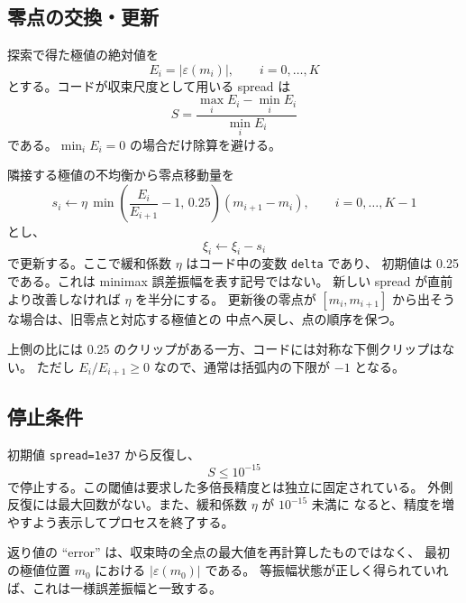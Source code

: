 \documentclass[a4paper,11pt]{ltjsarticle}
\newcommand{\code}[1]{\texttt{#1}}
\newcommand{\RelErr}{\varepsilon}
\begin{document}
\subsection{零点の交換・更新}

探索で得た極値の絶対値を
\begin{equation}
  E_i=|\RelErr(m_i)|,\qquad i=0,\ldots,K
\end{equation}
とする。コードが収束尺度として用いる spread は
\begin{equation}
  S=\frac{\max_i E_i-\min_i E_i}{\min_i E_i}
  \label{eq:spread}
\end{equation}
である。\(\min_i E_i=0\) の場合だけ除算を避ける。

隣接する極値の不均衡から零点移動量を
\begin{equation}
 s_i \leftarrow \eta\,
 \min\!\left(\frac{E_i}{E_{i+1}}-1,\,0.25\right)
 (m_{i+1}-m_i),
 \qquad i=0,\ldots,K-1
 \label{eq:step-update}
\end{equation}
とし、
\begin{equation}
  \xi_i\leftarrow\xi_i-s_i
  \label{eq:zero-update}
\end{equation}
で更新する。ここで緩和係数 \(\eta\) はコード中の変数 \code{delta} であり、
初期値は 0.25 である。これは minimax 誤差振幅を表す記号ではない。
新しい spread が直前より改善しなければ \(\eta\) を半分にする。
更新後の零点が \([m_i,m_{i+1}]\) から出そうな場合は、旧零点と対応する極値との
中点へ戻し、点の順序を保つ。

上側の比には 0.25 のクリップがある一方、コードには対称な下側クリップはない。
ただし \(E_i/E_{i+1}\geq0\) なので、通常は括弧内の下限が \(-1\) となる。

\subsection{停止条件}

初期値 \code{spread=1e37} から反復し、
\begin{equation}
  S\leq 10^{-15}
  \label{eq:stop}
\end{equation}
で停止する。この閾値は要求した多倍長精度とは独立に固定されている。
外側反復には最大回数がない。また、緩和係数 \(\eta\) が \(10^{-15}\) 未満に
なると、精度を増やすよう表示してプロセスを終了する。

返り値の ``error'' は、収束時の全点の最大値を再計算したものではなく、
最初の極値位置 \(m_0\) における \(|\RelErr(m_0)|\) である。
等振幅状態が正しく得られていれば、これは一様誤差振幅と一致する。
\end{document}
